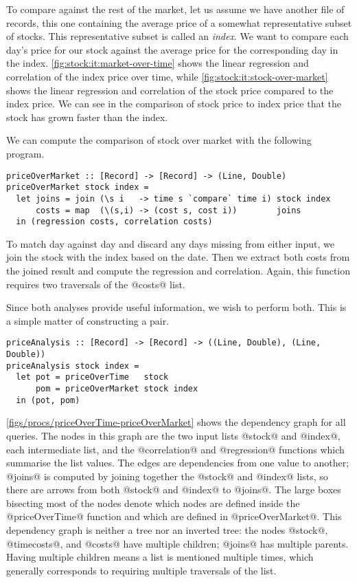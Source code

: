 To compare against the rest of the market, let us assume we have another file of records, this one containing the average price of a somewhat representative subset of stocks.
This representative subset is called an \emph{index}.
We want to compare each day's price for our stock against the average price for the corresponding day in the index.
\autoref{fig:stock:it:market-over-time} shows the linear regression and correlation of the index price over time, while \autoref{fig:stock:it:stock-over-market} shows the linear regression and correlation of the stock price compared to the index price.
We can see in the comparison of stock price to index price that the stock has grown faster than the index.

We can compute the comparison of stock over market with the following program.

\begin{lstlisting}
priceOverMarket :: [Record] -> [Record] -> (Line, Double)
priceOverMarket stock index =
  let joins = join (\s i   -> time s `compare` time i) stock index
      costs = map  (\(s,i) -> (cost s, cost i))        joins
  in (regression costs, correlation costs)
\end{lstlisting}

To match day against day and discard any days missing from either input, we join the stock with the index based on the date.
Then we extract both costs from the joined result and compute the regression and correlation.
Again, this function requires two traversals of the @costs@ list.

Since both analyses provide useful information, we wish to perform both.
This is a simple matter of constructing a pair.

\begin{lstlisting}
priceAnalysis :: [Record] -> [Record] -> ((Line, Double), (Line, Double))
priceAnalysis stock index =
  let pot = priceOverTime   stock
      pom = priceOverMarket stock index
  in (pot, pom)
\end{lstlisting}

\autoref{figs/procs/priceOverTime-priceOverMarket} shows the dependency graph for all queries.
The nodes in this graph are the two input lists @stock@ and @index@, each intermediate list, and the @correlation@ and @regression@ functions which summarise the list values.
The edges are dependencies from one value to another; @joins@ is computed by joining together the @stock@ and @index@ lists, so there are arrows from both @stock@ and @index@ to @joins@.
The large boxes bisecting most of the nodes denote which nodes are defined inside the @priceOverTime@ function and which are defined in @priceOverMarket@.
This dependency graph is neither a tree nor an inverted tree: the nodes @stock@, @timecosts@, and @costs@ have multiple children; @joins@ has multiple parents.
Having multiple children means a list is mentioned multiple times, which generally corresponds to requiring multiple traversals of the list.


